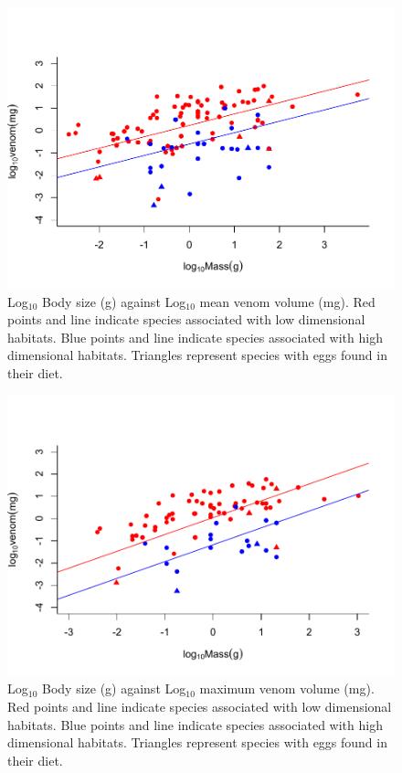 \begin{figure}[h!]
  \centering
  \includegraphics[width=.95\textwidth]{ch4-snakes/figure2aver.pdf}%
  \caption[ ]{Log$_{10}$ Body size (g) against Log$_{10}$ mean venom volume (mg). Red points and line indicate species associated with low dimensional habitats. Blue points and line indicate species associated with high dimensional habitats. Triangles represent species with eggs found in their diet.}
  \label{fig:Figure 4.2.a.}
\end{figure}




\begin{figure}[h!]
  \centering
  \includegraphics[width=.95\textwidth]{ch4-snakes/figure2max.pdf}%
  \caption[ ]{Log$_{10}$ Body size (g) against Log$_{10}$ maximum venom volume (mg). Red points and line indicate species associated with low dimensional habitats. Blue points and line indicate species associated with high dimensional habitats. Triangles represent species with eggs found in their diet.}
  \label{fig:Figure 4.2.b.}
\end{figure}


